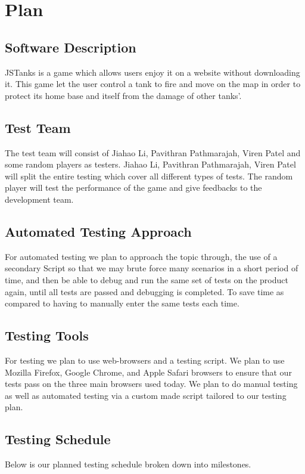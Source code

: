 \documentclass{article}
\begin{document}
\section{Plan}
\subsection{Software Description}
JSTanks is a game which allows users enjoy it on a website without downloading 
it. This game let the user control a tank to fire and move on the map in order 
to protect its home base and itself from the damage of other tanks'.
\subsection{Test Team}
The test team will consist of Jiahao Li, Pavithran Pathmarajah, Viren Patel 
and some random players as testers. Jiahao Li, Pavithran Pathmarajah, Viren 
Patel will split the entire testing which cover all different types of tests. 
The random player will test the performance of the game and give feedbacks to 
the development team.

\subsection{Automated Testing Approach}
For automated testing we plan to approach the topic through, the use of 
a secondary Script so that we may brute force many scenarios in a short period 
of time, and then be able to debug and run the same set of tests on the 
product again, until all tests are passed and debugging is completed. To save 
time as compared to having to manually enter the same tests each time.

\subsection{Testing Tools}
For testing we plan to use web-browsers and a testing script. We plan to use
Mozilla Firefox, Google Chrome, and Apple Safari browsers to ensure that our
tests pass on the three main browsers used today. We plan to do manual testing
as well as automated testing via a custom made script tailored to our testing
plan.

\subsection{Testing Schedule}
Below is our planned testing schedule broken down into milestones.
\end{document}
